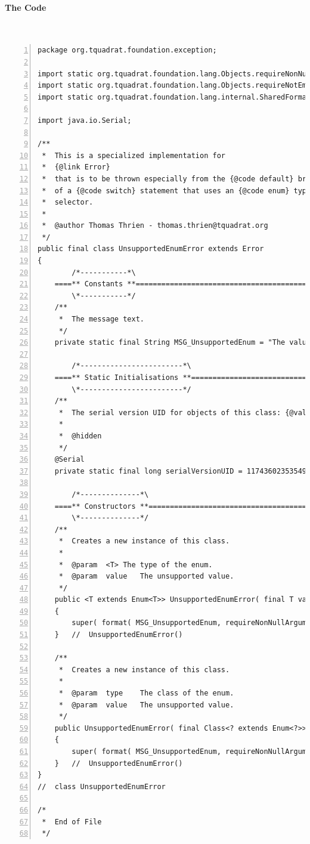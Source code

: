 \documentclass[12pt,a4paper,titlepage, parskip=half, headsepline, footsepline, cleardoubleplain]{scrbook}
\begin{document}
\paragraph{The Code} \
\begin{lstlisting}[numbers=left,caption={UnsupportedEnumError}]
package org.tquadrat.foundation.exception;

import static org.tquadrat.foundation.lang.Objects.requireNonNullArgument;
import static org.tquadrat.foundation.lang.Objects.requireNotEmptyArgument;
import static org.tquadrat.foundation.lang.internal.SharedFormatter.format;

import java.io.Serial;

/**
 *  This is a specialized implementation for
 *  {@link Error}
 *  that is to be thrown especially from the {@code default} branch
 *  of a {@code switch} statement that uses an {@code enum} type as
 *  selector.
 *
 *  @author Thomas Thrien - thomas.thrien@tquadrat.org
 */
public final class UnsupportedEnumError extends Error
{
        /*-----------*\
    ====** Constants **==============================================
        \*-----------*/
    /**
     *  The message text.
     */
    private static final String MSG_UnsupportedEnum = "The value '%2$s' of enum class '%1$s' is not supported";

        /*------------------------*\
    ====** Static Initialisations **=================================
        \*------------------------*/
    /**
     *  The serial version UID for objects of this class: {@value}.
     *
     *  @hidden
     */
    @Serial
    private static final long serialVersionUID = 1174360235354917591L;

        /*--------------*\
    ====** Constructors **===========================================
        \*--------------*/
    /**
     *  Creates a new instance of this class.
     *
     *  @param  <T> The type of the enum.
     *  @param  value   The unsupported value.
     */
    public <T extends Enum<T>> UnsupportedEnumError( final T value )
    {
        super( format( MSG_UnsupportedEnum, requireNonNullArgument( value, "value" ).getClass().getName(), value.name() ) );
    }   //  UnsupportedEnumError()

    /**
     *  Creates a new instance of this class.
     *
     *  @param  type    The class of the enum.
     *  @param  value   The unsupported value.
     */
    public UnsupportedEnumError( final Class<? extends Enum<?>> type, final String value )
    {
        super( format( MSG_UnsupportedEnum, requireNonNullArgument( type, "type" ).getName(), requireNotEmptyArgument( value, "value" ) ) );
    }   //  UnsupportedEnumError()
}
//  class UnsupportedEnumError

/*
 *  End of File
 */
 \end{lstlisting}

\listoftables

\lstlistoflistings

\printbibliography
\end{document}
